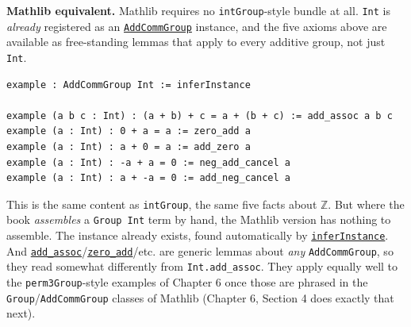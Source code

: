 \textbf{Mathlib equivalent.} Mathlib requires no \texttt{intGroup}-style bundle at all. \texttt{Int} is \emph{already} registered as an \href{https://loogle.lean-lang.org/?q=AddCommGroup}{\texttt{AddCommGroup}} instance, and the five axioms above are available as free-standing lemmas that apply to every additive group, not just \texttt{Int}.

\begin{lstlisting}
example : AddCommGroup Int := inferInstance

example (a b c : Int) : (a + b) + c = a + (b + c) := add_assoc a b c
example (a : Int) : 0 + a = a := zero_add a
example (a : Int) : a + 0 = a := add_zero a
example (a : Int) : -a + a = 0 := neg_add_cancel a
example (a : Int) : a + -a = 0 := add_neg_cancel a
\end{lstlisting}

This is the same content as \texttt{intGroup}, the same five facts about \(\mathbb{Z}\). But where the book \emph{assembles} a \texttt{Group Int} term by hand, the Mathlib version has nothing to assemble. The instance already exists, found automatically by \href{https://loogle.lean-lang.org/?q=inferInstance}{\texttt{inferInstance}}. And \href{https://loogle.lean-lang.org/?q=add_assoc}{\texttt{add\_\allowbreak{}assoc}}/\href{https://loogle.lean-lang.org/?q=zero_add}{\texttt{zero\_\allowbreak{}add}}/etc. are generic lemmas about \emph{any} \texttt{AddCommGroup}, so they read somewhat differently from \texttt{Int.add\_\allowbreak{}assoc}. They apply equally well to the \texttt{perm3Group}-style examples of Chapter 6 once those are phrased in the \texttt{Group}/\texttt{AddCommGroup} classes of Mathlib (Chapter 6, Section 4 does exactly that next).
